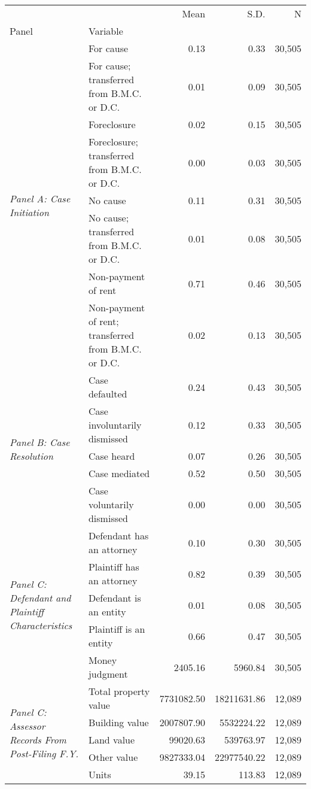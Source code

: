 \begin{tabular}{llrrr}
\toprule
 &  & Mean & S.D. & N \\
Panel & Variable &  &  &  \\
\midrule
\multirow[c]{8}{*}{\textit{Panel A: Case Initiation}} & For cause & 0.13 & 0.33 & 30,505 \\
 & For cause; transferred from B.M.C. or D.C. & 0.01 & 0.09 & 30,505 \\
 & Foreclosure & 0.02 & 0.15 & 30,505 \\
 & Foreclosure; transferred from B.M.C. or D.C. & 0.00 & 0.03 & 30,505 \\
 & No cause & 0.11 & 0.31 & 30,505 \\
 & No cause; transferred from B.M.C. or D.C. & 0.01 & 0.08 & 30,505 \\
 & Non-payment of rent & 0.71 & 0.46 & 30,505 \\
 & Non-payment of rent; transferred from B.M.C. or D.C. & 0.02 & 0.13 & 30,505 \\
\cline{1-5}
\multirow[c]{5}{*}{\textit{Panel B: Case Resolution}} & Case defaulted & 0.24 & 0.43 & 30,505 \\
 & Case involuntarily dismissed & 0.12 & 0.33 & 30,505 \\
 & Case heard & 0.07 & 0.26 & 30,505 \\
 & Case mediated & 0.52 & 0.50 & 30,505 \\
 & Case voluntarily dismissed & 0.00 & 0.00 & 30,505 \\
\cline{1-5}
\multirow[c]{5}{*}{\textit{Panel C: Defendant and Plaintiff Characteristics}} & Defendant has an attorney & 0.10 & 0.30 & 30,505 \\
 & Plaintiff has an attorney & 0.82 & 0.39 & 30,505 \\
 & Defendant is an entity & 0.01 & 0.08 & 30,505 \\
 & Plaintiff is an entity & 0.66 & 0.47 & 30,505 \\
 & Money judgment & 2405.16 & 5960.84 & 30,505 \\
\cline{1-5}
\multirow[c]{5}{*}{\textit{Panel C: Assessor Records From Post-Filing F.Y.}} & Total property value & 7731082.50 & 18211631.86 & 12,089 \\
 & Building value & 2007807.90 & 5532224.22 & 12,089 \\
 & Land value & 99020.63 & 539763.97 & 12,089 \\
 & Other value & 9827333.04 & 22977540.22 & 12,089 \\
 & Units & 39.15 & 113.83 & 12,089 \\

\end{tabular}
